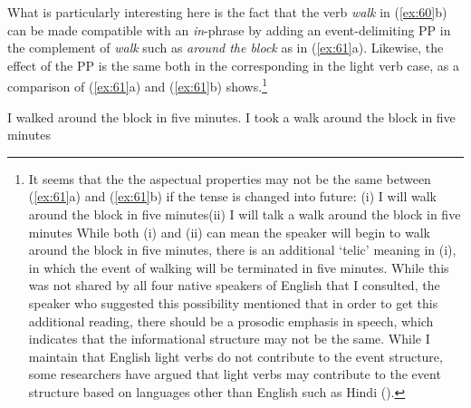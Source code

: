 \largerpage[-1]
What is particularly interesting here is the fact that the verb \textit{walk} in (\ref{ex:60}b) can be made compatible with an \textit{in}-phrase by adding an event-delimiting \ac{PP} in the complement of \textit{walk} such as \textit{around the block} as in (\ref{ex:61}a). Likewise, the effect of the \ac{PP} is the same both in the corresponding in the light verb case, as a comparison of (\ref{ex:61}a) and (\ref{ex:61}b) shows.\footnote{\textrm{It seems that the the aspectual properties may not be the same between (\ref{ex:61}a) and (\ref{ex:61}b) if the tense is changed into future:} \textrm{(i)  I will walk around the block in five minutes}\textrm{(ii)  I will talk a walk around the block in five minutes} While both (i) and (ii) can mean the speaker will begin to walk around the block in five minutes, there is an additional ‘telic’ meaning in (i), in which the event of walking will be terminated in five minutes. While this was not shared by all four native speakers of English that I consulted, the speaker who suggested this possibility mentioned that in order to get this additional reading, there should be a prosodic emphasis in speech, which indicates that the informational structure may not be the same. While I maintain that English light verbs do not contribute to the event structure, some researchers have argued that light verbs may contribute to the event structure based on languages other than English such as Hindi (\citealt{Mohanan2006}). }

\newpage
\ea\label{ex:61}
\ea I walked around the block in five minutes.
\ex  I took a walk around the block in five minutes
\z
\z


